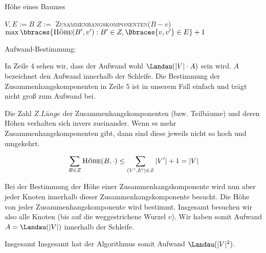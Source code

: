 \begin{solution}
\begin{algorithm}
  \caption{Höhe eines Baumes}
  \begin{algorithmic}[1]
      \State $V, E := B$
        \State {}
        \State $Z :=$ \textsc{Zusammenhangskomponenten}($B - v$)
        \State \Return $\max \bbraces{\textsc{Höhe}(B^\prime, v^\prime): B^\prime \in Z, \Bbraces{v, v^\prime} \in E} + 1$
      \EndIf
    \EndProcedure
  \end{algorithmic}
\end{algorithm}

Aufwand-Bestimmung:

In Zeile $4$ sehen wir, dass der Aufwand wohl $\Landau(|V| \cdot A)$ sein wird.
$A$ bezeichnet den Aufwand innerhalb der Schleife.
Die Bestimmung der Zusammenhangskomponenten in Zeile $5$ ist in unserem Fall einfach und trägt nicht groß zum Aufwand bei.

Die Zahl  $Z.\textit{Länge}$ der Zusammenhangskomponenten (bzw. Teilbäume) und deren Höhen verhalten sich invers zueinander.
Wenn es mehr Zusammenhangskomponenten gibt, dann sind diese jeweils nicht so hoch und umgekehrt.

\begin{align*}
  \sum_{B \in Z} \textsc{Höhe}(B, \cdot)
  \leq
  \sum_{(V^\prime, E^\prime) \in Z} |V^\prime| + 1
  =
  |V|
\end{align*}

Bei der Bestimmung der Höhe einer Zusammenhangskomponente wird nun aber jeder Knoten innerhalb dieser Zusammenhangskomponente besucht.
Die Höhe von jeder Zusammenhangskomponente wird bestimmt.
Insgesamt besuchen wir also alle Knoten (bis auf die weggestrichene Wurzel $v$).
Wir haben somit Aufwand $A = \Landau(|V|)$ innerhalb der Schleife.

Insgesamt Insgesamt hat der Algorithmus somit Aufwand $\Landau(|V|^2)$.

\end{solution}


